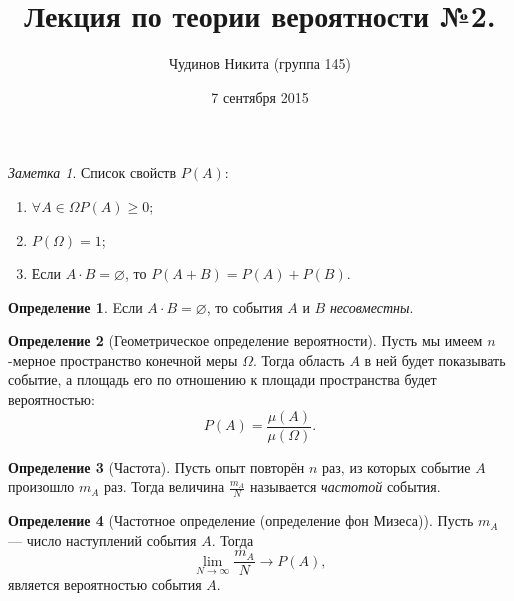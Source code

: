 \documentclass[a4paper,12pt]{article}
\let\emptyset\varnothing
\theoremstyle{remark}
\newtheorem*{note}{Заметка}
\theoremstyle{definition}
\newtheorem{definition}{Определение}
\begin{document}
\sloppy
\author{Чудинов Никита (группа 145)}
\date{7 сентября 2015}
\title{\vspace{-2.0cm}Лекция по теории вероятности №2.}
\frenchspacing

\maketitle

\begin{note}
	Список свойств \(P(A)\):
	\begin{enumerate}
		\item \(\forall A \in \Omega P(A) \geqslant 0\);
	    \item \(P(\Omega) = 1\);
	    \item Если \(A \cdot B = \emptyset\), то \(P(A + B) = P(A) + P(B)\).
	\end{enumerate}
\end{note}

\begin{definition}
	Eсли \(A \cdot B = \emptyset\), то события \(A\) и \(B\) \emph{несовместны}.
\end{definition}


\begin{definition}[Геометрическое определение вероятности]
	Пусть мы имеем \(n\)-мерное пространство конечной меры \(\Omega\). Тогда область \(A\) в ней будет показывать событие, а площадь его по отношению к площади пространства будет вероятностью:
	\begin{equation*}
		P(A) = \frac{\mu(A)}{\mu(\Omega)}.
	\end{equation*}
\end{definition}

\begin{definition}[Частота]
	Пусть опыт повторён \(n\) раз, из которых событие \(A\) произошло \(m_A\) раз. Тогда величина \(\frac{m_A}{N}\) называется \emph{частотой} события.
\end{definition}


\begin{definition}[Частотное определение (определение фон Мизеса)]
	Пусть \(m_A\) --- число наступлений события \(A\). Тогда
	\begin{equation*}
		\lim_{N \rightarrow \infty} \frac{m_A}{N} \rightarrow P(A),
	\end{equation*}
	является вероятностью события \(A\).
\end{definition}
\end{document}
